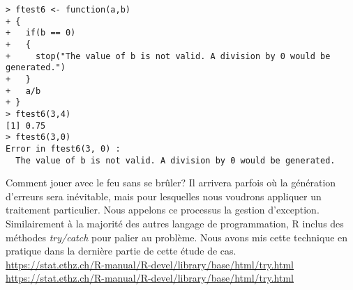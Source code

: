\begin{lstlisting}[caption = Gestion des erreurs sous R,label=src:errorManagement]
> ftest6 <- function(a,b)
+ {
+   if(b == 0)
+   {
+     stop("The value of b is not valid. A division by 0 would be generated.")
+   }
+   a/b
+ }
> ftest6(3,4)
[1] 0.75
> ftest6(3,0)
Error in ftest6(3, 0) : 
  The value of b is not valid. A division by 0 would be generated.
\end{lstlisting}

\begin{moreInfo}{Comment jouer avec le feu sans se brûler?}
	Il arrivera parfois où la génération d'erreurs sera inévitable, mais pour lesquelles nous voudrons appliquer un traitement particulier. Nous appelons ce processus la gestion d'exception. Similairement à la majorité des autres langage de programmation, R inclus des méthodes \emph{try/catch} pour palier au problème. Nous avons mis cette technique en pratique dans la dernière partie de cette étude de cas. \\
	\url{https://stat.ethz.ch/R-manual/R-devel/library/base/html/try.html} \\
	\url{https://stat.ethz.ch/R-manual/R-devel/library/base/html/try.html}
\end{moreInfo}